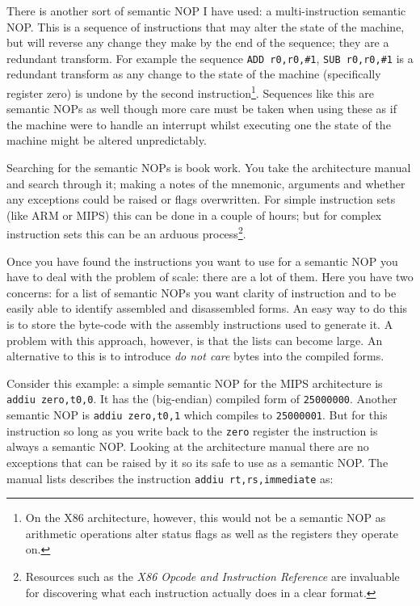 \documentclass[10pt]{book}
\begin{document}
There is another sort of semantic NOP I have used: a multi-instruction
semantic NOP. This is a sequence of instructions that may alter the
state of the machine, but will reverse any change they make by the end
of the sequence; they are a redundant transform. For example the
sequence \lstinline!ADD r0,r0,#1!, \lstinline!SUB r0,r0,#1! is a
redundant transform as any change to the state of the machine
(specifically register zero) is undone by the second
instruction\footnote{On the X86
  architecture\autocite{IntelCorporation:1997ta}, however, this would
  not be a semantic NOP as arithmetic operations alter status flags as
  well as the registers they operate on\autocite{refx86}.}. Sequences
like this are semantic NOPs as well though more care must be taken when
using these as if the machine were to handle an interrupt whilst
executing one the state of the machine might be altered unpredictably.

Searching for the semantic NOPs is book work. You take the architecture
manual and search through it; making a notes of the mnemonic, arguments
and whether any exceptions could be raised or flags overwritten. For
simple instruction sets (like ARM or MIPS) this can be done in a couple
of hours; but for complex instruction sets this can be an arduous
process\footnote{Resources such as the \emph{X86 Opcode and Instruction
  Reference} \autocite{refx86} are invaluable for discovering what each
  instruction actually does in a clear format.}.

Once you have found the instructions you want to use for a semantic NOP
you have to deal with the problem of scale: there are a lot of them.
Here you have two concerns: for a list of semantic NOPs you want clarity
of instruction and to be easily able to identify assembled and
disassembled forms. An easy way to do this is to store the byte-code
with the assembly instructions used to generate it. A problem with this
approach, however, is that the lists can become large. An alternative to
this is to introduce \emph{do not care} bytes into the compiled forms.

Consider this example: a simple semantic NOP for the MIPS architecture
is \lstinline!addiu zero,t0,0!. It has the (big-endian) compiled form of
\lstinline!25000000!. Another semantic NOP is
\lstinline!addiu zero,t0,1! which compiles to \lstinline!25000001!. But
for this instruction so long as you write back to the \lstinline!zero!
register the instruction is always a semantic NOP. Looking at the
architecture manual\autocite{MIPSTechnologiesInc:2011ta} there are no
exceptions that can be raised by it so its safe to use as a semantic
NOP. The manual lists describes the instruction
\lstinline!addiu rt,rs,immediate! as:
\end{document}
